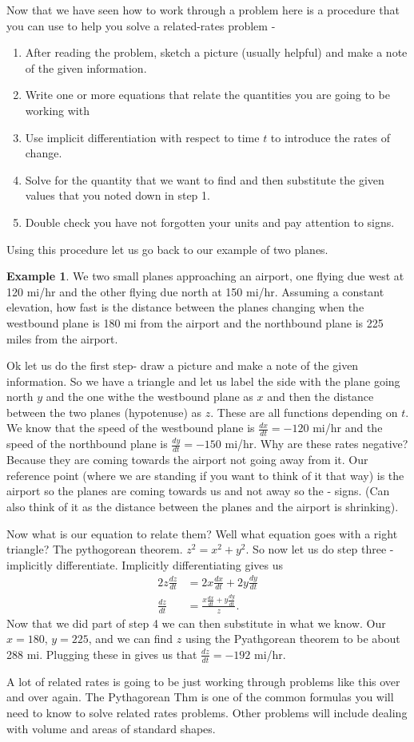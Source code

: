 \documentclass[12pt,reqno]{article}
\theoremstyle{definition}
\newtheorem*{Example}{Example}
\begin{document}
Now that we have seen how to work through a problem here is a procedure that you can use to help you solve a related-rates problem - 
\begin{enumerate}
	\item[1.] After reading the problem, sketch a picture (usually helpful) and make a note of the given information. 
	\item[2.] Write one or more equations that relate the quantities you are going to be working with 
	\item[3.] Use implicit differentiation with respect to time $t$ to introduce the rates of change. 
	\item[4.] Solve for the quantity that we want to find and then substitute the given values that you noted down in step 1. 
	\item[5.] Double check you have not forgotten your units and pay attention to signs. 
\end{enumerate}

Using this procedure let us go back to our example of two planes. 
\begin{Example}
	We two small planes approaching an airport, one flying due west at 120 mi/hr and the other flying due north at 150 mi/hr. Assuming a constant elevation, how fast is the distance between the planes changing when the westbound plane is 180 mi from the airport and the northbound plane is 225 miles from the airport. 
	
	Ok let us do the first step- draw a picture and make a note of the given information. So we have a triangle and let us label the side with the plane going north $y$ and the one withe the westbound plane as $x$ and then the distance between the two planes (hypotenuse) as $z$. These are all functions depending on $t$. We know that the speed of the westbound plane is $\frac{dx}{dt} = -120$ mi/hr and the speed of the northbound plane is $\frac{dy}{dt} = - 150$ mi/hr. Why are these rates negative? Because they are coming towards the airport not going away from it. Our reference point (where we are standing if you want to think of it that way) is the airport so the planes are coming towards us and not away so the - signs. (Can also think of it as the distance between the planes and the airport is shrinking). 
	
	Now what is our equation to relate them? Well what equation goes with a right triangle? The pythogorean theorem. $z^2 = x^2 + y^2$. So now let us do step three - implicitly differentiate. Implicitly differentiating gives us 
	\begin{align*}
		2z \frac{dz}{dt} &= 2x \frac{dx}{dt} + 2y \frac{dy}{dt} \\
		\frac{dz}{dt} &= \frac{x \frac{dx}{dt} + y \frac{dy}{dt}}{z}.
	\end{align*}
	Now that we did part of step 4 we can then substitute in what we know. Our $x = 180$, $y = 225$, and we can find $z$ using the Pyathgorean theorem to be about 288 mi. Plugging these in gives us that $\frac{dz}{dt} = - 192$ mi/hr. 
\end{Example}

A lot of related rates is going to be just working through problems like this over and over again. The Pythagorean Thm is one of the common formulas you will need to know to solve related rates problems. Other problems will include dealing with volume and areas of standard shapes. 
\end{document}
